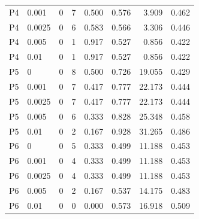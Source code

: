 \begin{longtable}{llrrrrrr}
P4 & 0.001 & 0 & 7 & 0.500 & 0.576 & 3.909 & 0.462\\

P4 & 0.0025 & 0 & 6 & 0.583 & 0.566 & 3.306 & 0.446\\

P4 & 0.005 & 0 & 1 & 0.917 & 0.527 & 0.856 & 0.422\\

P4 & 0.01 & 0 & 1 & 0.917 & 0.527 & 0.856 & 0.422\\

P5 & 0 & 0 & 8 & 0.500 & 0.726 & 19.055 & 0.429\\

P5 & 0.001 & 0 & 7 & 0.417 & 0.777 & 22.173 & 0.444\\

P5 & 0.0025 & 0 & 7 & 0.417 & 0.777 & 22.173 & 0.444\\

P5 & 0.005 & 0 & 6 & 0.333 & 0.828 & 25.348 & 0.458\\

P5 & 0.01 & 0 & 2 & 0.167 & 0.928 & 31.265 & 0.486\\

P6 & 0 & 0 & 5 & 0.333 & 0.499 & 11.188 & 0.453\\

P6 & 0.001 & 0 & 4 & 0.333 & 0.499 & 11.188 & 0.453\\

P6 & 0.0025 & 0 & 4 & 0.333 & 0.499 & 11.188 & 0.453\\

P6 & 0.005 & 0 & 2 & 0.167 & 0.537 & 14.175 & 0.483\\

P6 & 0.01 & 0 & 0 & 0.000 & 0.573 & 16.918 & 0.509\\

\bottomrule\end{longtable}\endgroup

